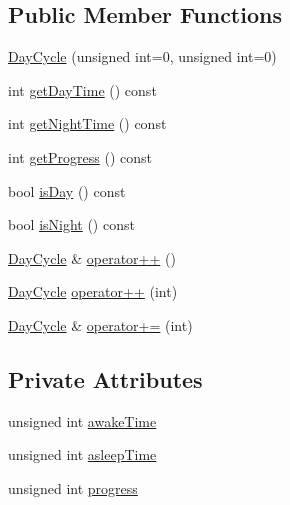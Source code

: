 \subsection*{Public Member Functions}
\begin{DoxyCompactItemize}
\item 
\hyperlink{classDayCycle_a9a2d185823b938e0ff6a74d21b5225a5_a9a2d185823b938e0ff6a74d21b5225a5}{Day\+Cycle} (unsigned int=0, unsigned int=0)
\item 
int \hyperlink{classDayCycle_a9bd40be57103509887314494419c7f1b_a9bd40be57103509887314494419c7f1b}{get\+Day\+Time} () const
\item 
int \hyperlink{classDayCycle_aeeb7012fe96467e4a179a195e8851d82_aeeb7012fe96467e4a179a195e8851d82}{get\+Night\+Time} () const
\item 
int \hyperlink{classDayCycle_aab4c411cdcb1b80daa5219a6aa339ebe_aab4c411cdcb1b80daa5219a6aa339ebe}{get\+Progress} () const
\item 
bool \hyperlink{classDayCycle_a143c56cd6f6bd7ff5a3b73e385ec771e_a143c56cd6f6bd7ff5a3b73e385ec771e}{is\+Day} () const
\item 
bool \hyperlink{classDayCycle_aac8bd32b0e81f5b30d2853abb5925d3e_aac8bd32b0e81f5b30d2853abb5925d3e}{is\+Night} () const
\item 
\hyperlink{classDayCycle}{Day\+Cycle} \& \hyperlink{classDayCycle_a44a7b511e82ac36f4937867a6ff0de99_a44a7b511e82ac36f4937867a6ff0de99}{operator++} ()
\item 
\hyperlink{classDayCycle}{Day\+Cycle} \hyperlink{classDayCycle_a50cc0f4f794586eeaf44dba56beb6880_a50cc0f4f794586eeaf44dba56beb6880}{operator++} (int)
\item 
\hyperlink{classDayCycle}{Day\+Cycle} \& \hyperlink{classDayCycle_ad4603ee10b8a03540cefaa39070a3c98_ad4603ee10b8a03540cefaa39070a3c98}{operator+=} (int)
\end{DoxyCompactItemize}
\subsection*{Private Attributes}
\begin{DoxyCompactItemize}
\item 
unsigned int \hyperlink{classDayCycle_ac53e82e6492f02405b3336bf9ac3c606_ac53e82e6492f02405b3336bf9ac3c606}{awake\+Time}
\item 
unsigned int \hyperlink{classDayCycle_af544568ce6c2e04a2f04a76331a9ce05_af544568ce6c2e04a2f04a76331a9ce05}{asleep\+Time}
\item 
unsigned int \hyperlink{classDayCycle_ac1a08b3deca37cf2f182406d956876f3_ac1a08b3deca37cf2f182406d956876f3}{progress}
\end{DoxyCompactItemize}


